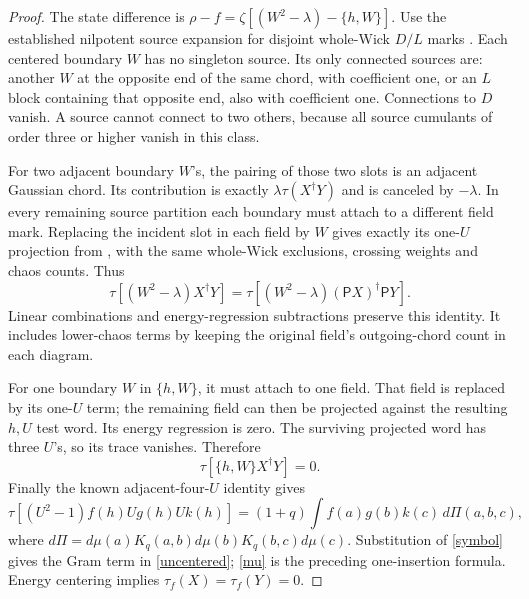 \documentclass[11pt]{article}
\newcommand{\tr}{\tau}
\newcommand{\PP}{\mathsf P}
\begin{document}
\begin{proof}
The state difference is
$\rho-f=\zeta[(W^2-\lambda)-\{h,W\}]$.
Use the established nilpotent source expansion for disjoint
whole-Wick $D/L$ marks \cite{multi,higher}. Each centered boundary
$W$ has no singleton source. Its only connected sources are:
another $W$ at the opposite end of the same chord, with coefficient
one, or an $L$ block containing that opposite end, also with
coefficient one. Connections to $D$ vanish. A source cannot connect
to two others, because all source cumulants of order three or
higher vanish in this class.

For two adjacent boundary $W$'s, the pairing of those two slots
is an adjacent Gaussian chord. Its contribution is exactly
$\lambda\tr(X^\dagger Y)$ and is canceled by $-\lambda$.
In every remaining source partition each boundary must attach to
a different field mark. Replacing the incident slot in each field
by $W$ gives exactly its one-$U$ projection from \cite{mean}, with
the same whole-Wick exclusions, crossing weights and chaos counts.
Thus
\begin{equation}\label{even}
 \tr[(W^2-\lambda)X^\dagger Y]
 =\tr[(W^2-\lambda)(\PP X)^\dagger\PP Y].
\end{equation}
Linear combinations and energy-regression subtractions preserve
this identity. It includes lower-chaos terms by keeping the
original field's outgoing-chord count in each diagram.

For one boundary $W$ in $\{h,W\}$, it must attach to one field.
That field is replaced by its one-$U$ term; the remaining field
can then be projected against the resulting $h,U$ test word.
Its energy regression is zero. The surviving projected word has
three $U$'s, so its trace vanishes. Therefore
\begin{equation}\label{odd}
 \tr[\{h,W\}X^\dagger Y]=0.
\end{equation}
Finally the known adjacent-four-$U$ identity \cite{response} gives
\[
 \tr[(U^2-1)f(h)Ug(h)Uk(h)]
 =(1+q)\int f(a)g(b)k(c)\,d\Pi(a,b,c),
\]
where $d\Pi=d\mu(a)K_q(a,b)d\mu(b)K_q(b,c)d\mu(c)$.
Substitution of \eqref{symbol} gives the Gram term in
\eqref{uncentered}; \eqref{mu} is the preceding one-insertion
formula. Energy centering implies $\tau_f(X)=\tau_f(Y)=0$.
\end{proof}

\newpage
\end{document}
